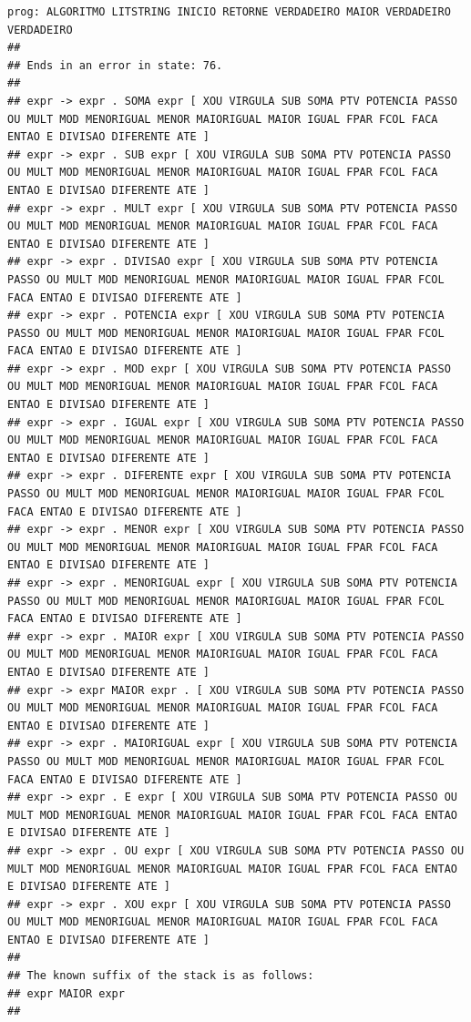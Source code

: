 \documentclass[hidelinks,12pt]{article}
\begin{document}
\begin{lstlisting}
prog: ALGORITMO LITSTRING INICIO RETORNE VERDADEIRO MAIOR VERDADEIRO VERDADEIRO 
##
## Ends in an error in state: 76.
##
## expr -> expr . SOMA expr [ XOU VIRGULA SUB SOMA PTV POTENCIA PASSO OU MULT MOD MENORIGUAL MENOR MAIORIGUAL MAIOR IGUAL FPAR FCOL FACA ENTAO E DIVISAO DIFERENTE ATE ]
## expr -> expr . SUB expr [ XOU VIRGULA SUB SOMA PTV POTENCIA PASSO OU MULT MOD MENORIGUAL MENOR MAIORIGUAL MAIOR IGUAL FPAR FCOL FACA ENTAO E DIVISAO DIFERENTE ATE ]
## expr -> expr . MULT expr [ XOU VIRGULA SUB SOMA PTV POTENCIA PASSO OU MULT MOD MENORIGUAL MENOR MAIORIGUAL MAIOR IGUAL FPAR FCOL FACA ENTAO E DIVISAO DIFERENTE ATE ]
## expr -> expr . DIVISAO expr [ XOU VIRGULA SUB SOMA PTV POTENCIA PASSO OU MULT MOD MENORIGUAL MENOR MAIORIGUAL MAIOR IGUAL FPAR FCOL FACA ENTAO E DIVISAO DIFERENTE ATE ]
## expr -> expr . POTENCIA expr [ XOU VIRGULA SUB SOMA PTV POTENCIA PASSO OU MULT MOD MENORIGUAL MENOR MAIORIGUAL MAIOR IGUAL FPAR FCOL FACA ENTAO E DIVISAO DIFERENTE ATE ]
## expr -> expr . MOD expr [ XOU VIRGULA SUB SOMA PTV POTENCIA PASSO OU MULT MOD MENORIGUAL MENOR MAIORIGUAL MAIOR IGUAL FPAR FCOL FACA ENTAO E DIVISAO DIFERENTE ATE ]
## expr -> expr . IGUAL expr [ XOU VIRGULA SUB SOMA PTV POTENCIA PASSO OU MULT MOD MENORIGUAL MENOR MAIORIGUAL MAIOR IGUAL FPAR FCOL FACA ENTAO E DIVISAO DIFERENTE ATE ]
## expr -> expr . DIFERENTE expr [ XOU VIRGULA SUB SOMA PTV POTENCIA PASSO OU MULT MOD MENORIGUAL MENOR MAIORIGUAL MAIOR IGUAL FPAR FCOL FACA ENTAO E DIVISAO DIFERENTE ATE ]
## expr -> expr . MENOR expr [ XOU VIRGULA SUB SOMA PTV POTENCIA PASSO OU MULT MOD MENORIGUAL MENOR MAIORIGUAL MAIOR IGUAL FPAR FCOL FACA ENTAO E DIVISAO DIFERENTE ATE ]
## expr -> expr . MENORIGUAL expr [ XOU VIRGULA SUB SOMA PTV POTENCIA PASSO OU MULT MOD MENORIGUAL MENOR MAIORIGUAL MAIOR IGUAL FPAR FCOL FACA ENTAO E DIVISAO DIFERENTE ATE ]
## expr -> expr . MAIOR expr [ XOU VIRGULA SUB SOMA PTV POTENCIA PASSO OU MULT MOD MENORIGUAL MENOR MAIORIGUAL MAIOR IGUAL FPAR FCOL FACA ENTAO E DIVISAO DIFERENTE ATE ]
## expr -> expr MAIOR expr . [ XOU VIRGULA SUB SOMA PTV POTENCIA PASSO OU MULT MOD MENORIGUAL MENOR MAIORIGUAL MAIOR IGUAL FPAR FCOL FACA ENTAO E DIVISAO DIFERENTE ATE ]
## expr -> expr . MAIORIGUAL expr [ XOU VIRGULA SUB SOMA PTV POTENCIA PASSO OU MULT MOD MENORIGUAL MENOR MAIORIGUAL MAIOR IGUAL FPAR FCOL FACA ENTAO E DIVISAO DIFERENTE ATE ]
## expr -> expr . E expr [ XOU VIRGULA SUB SOMA PTV POTENCIA PASSO OU MULT MOD MENORIGUAL MENOR MAIORIGUAL MAIOR IGUAL FPAR FCOL FACA ENTAO E DIVISAO DIFERENTE ATE ]
## expr -> expr . OU expr [ XOU VIRGULA SUB SOMA PTV POTENCIA PASSO OU MULT MOD MENORIGUAL MENOR MAIORIGUAL MAIOR IGUAL FPAR FCOL FACA ENTAO E DIVISAO DIFERENTE ATE ]
## expr -> expr . XOU expr [ XOU VIRGULA SUB SOMA PTV POTENCIA PASSO OU MULT MOD MENORIGUAL MENOR MAIORIGUAL MAIOR IGUAL FPAR FCOL FACA ENTAO E DIVISAO DIFERENTE ATE ]
##
## The known suffix of the stack is as follows:
## expr MAIOR expr 
##


\end{lstlisting}
\end{document}
